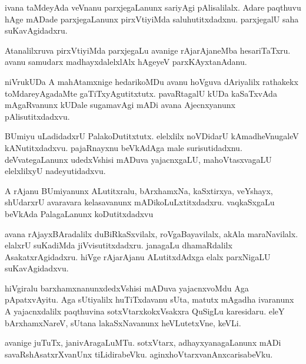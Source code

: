 \documentclass{article}
\begin{document}
\begin{mn}
ivana taMdeyAda veVnanu parxjegaLanunx sariyAgi pAlisalilalx. Adare paqthuvu 
hAge mADade parxjegaLanunx pirxVtiyiMda saluhutitxdadxnu. parxjegalU saha suKavAgidadxru.
\end{mn}

\begin{mn}
Atanalilxruva pirxVtiyiMda parxjegaLu avanige rAjarAjaneMba hesariTaTxru.  
avanu samudarx madhayxdalelxlAlx hAgeyeV parxKAyxtanAdanu.
\end{mn}

\begin{mn}
niVrukUDa A mahAtamxnige hedarikoMDu avanu hoVguva dAriyalilx  rathakekx 
toMdareyAgadaMte gaTiTxyAgutitxtutx.  pavaRtagalU kUDa kaSaTxvAda mAgaRvanunx 
kUDale sugamavAgi mADi avana Ajecnxyanunx pAlisutitxdadxvu.
\end{mn}

\begin{mn}
BUmiyu uLadidadxrU PalakoDutitxtutx.  elelxlilx noVDidarU kAmadheVnugaleV 
kANutitxdadxvu. pajaRnayxnu beVkAdAga male surisutidadxnu. deVvategaLanunx 
udedxVshisi mADuva yajacnxgaLU, mahoVtasxvagaLU elelxlilxyU nadeyutidadxvu.
\end{mn}

\begin{mn}
A rAjanu BUmiyanunx ALutitxralu, bArxhamxNa, kaSxtirxya, veYshayx, 
shUdarxrU  avaravara kelasavanunx mADikoLuLxtitxdadxru.  vaqkaSxgaLu 
beVkAda PalagaLanunx koDutitxdadxvu
\end{mn}

\begin{mn}
avana rAjayxBAradalilx  duBiRkaSxvilalx, roVgaBayavilalx, akAla maraNavilalx. 
elalxrU suKadiMda jiVvisutitxdadxru.  janagaLu  dhamaRdalilx AsakatxrAgidadxru.  
hiVge rAjarAjanu ALutitxdAdxga elalx parxNigaLU suKavAgidadxvu.
\end{mn}

\begin{mn}
hiVgiralu barxhamxnanunxdedxVshisi mADuva yajacnxvoMdu Aga pApatxvAyitu. 
Aga sUtiyalilx huTiTxdavanu sUta, matutx mAgadha ivaranunx A yajacnxdalilx 
paqthuvina sotxVtarxkokxVsakxra QuSigLu karesidaru. eleY bArxhamxNareV, 
sUtana lakaSxNavanunx heVLutetxVne, keVLi.
\end{mn}

\begin{mn}
avanige juTuTx, janivAragaLuMTu.  sotxVtarx, adhayxyanagaLanunx mADi 
savaRshAsatxrXvanUnx tiLidirabeVku.  aginxhoVtarxvanAnxcarisabeVku.
\end{mn}
\end{document}
